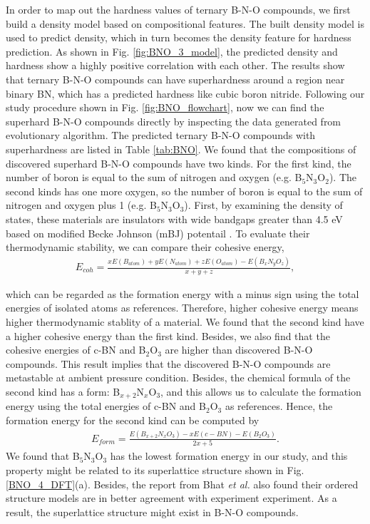     In order to map out the hardness values of ternary B-N-O compounds, we first build a density model based on compositional features. The built density model is used to predict density, which in turn becomes the density feature for hardness prediction. As shown in Fig. \ref{fig:BNO_3_model}, the predicted density and hardness show a highly positive correlation with each other. The results show that ternary B-N-O compounds can have superhardness around a region near binary BN, which has a predicted hardness like cubic boron nitride. Following our study procedure shown in Fig. \ref{fig:BNO_flowchart}, now we can find the superhard B-N-O compounds directly by inspecting the data generated from evolutionary algorithm. The predicted ternary B-N-O compounds with superhardness are listed in Table \ref{tab:BNO}. We found that the compositions of discovered superhard B-N-O compounds have two kinds. For the first kind, the number of boron is equal to the sum of nitrogen and oxygen (e.g. B$_5$N$_3$O$_2$). The second kinds has one more oxygen, so the number of boron is equal to the sum of nitrogen and oxygen plus 1 (e.g. B$_5$N$_3$O$_3$). First, by examining the density of states, these materials are insulators with wide bandgaps greater than 4.5 eV based on modified Becke Johnson (mBJ) potentail \cite{mBJ_1,mBJ_2}. To evaluate their thermodynamic stability, we can compare their cohesive energy,
    \begin{equation}
	\label{eq:cohesive}
	\begin{aligned}
		E_{coh} =  \frac{xE(B_{atom}) + yE(N_{atom}) + zE(O_{atom}) - E(B_xN_yO_z)} {x+y+z},
	\end{aligned}
	\end{equation}
    
    which can be regarded as the formation energy with a minus sign using the total energies of isolated atoms as references. Therefore, higher cohesive energy means higher thermodynamic stablity of a material. We found that the second kind have a higher cohesive energy than the first kind. Besides, we also find that the cohesive energies of c-BN and B$_2$O$_3$ are higher than discovered B-N-O compounds. This result implies that the discovered B-N-O compounds are metastable at ambient pressure condition. Besides, the chemical formula of the second kind has a form: B$_{x+2}$N$_x$O$_{3}$, and this allows us to calculate the formation energy using the total energies of c-BN and B$_2$O$_3$ as references. Hence, the formation energy for the second kind can be computed by
	\begin{equation}
	\label{eq:formation}
	\begin{aligned}
		E_{form} =  \frac{E(B_{x+2}N_xO_{3}) - xE(c-BN) - E(B_2O_3) } {2x+5}.
	\end{aligned}
	\end{equation}
    We found that B$_5$N$_3$O$_3$ has the lowest formation energy in our study, and this property might be related to its superlattice structure shown in Fig. \ref{BNO_4_DFT}(a). Besides, the report from Bhat {\it et al.} also found their ordered structure models are in better agreement with experiment experiment. As a result, the superlattice structure might exist in B-N-O compounds.
    
